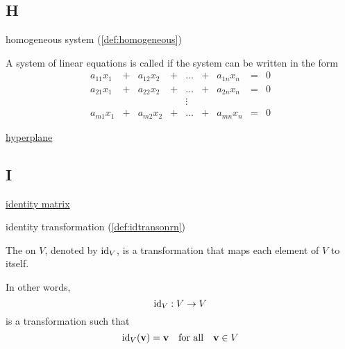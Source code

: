 \documentclass{ximera}
\begin{document}
\subsection{H}


homogeneous system (\ref{def:homogeneous})
\begin{expandable}
    A system of linear equations is called  if the system can be written in the form
$$\begin{array}{ccccccccc}
      a_{11}x_1 &+ &a_{12}x_2&+&\ldots&+&a_{1n}x_n&= &0 \\
	 a_{21}x_1 &+ &a_{22}x_2&+&\ldots&+&a_{2n}x_n&= &0 \\
     &&&&\vdots&&&& \\
     a_{m1}x_1 &+ &a_{m2}x_2&+&\ldots&+&a_{mn}x_n&= &0
    \end{array}$$
\end{expandable}

\href{https://ximera.osu.edu/oerlinalg/LinearAlgebra/RRN-0030/main}{hyperplane}

\subsection{I}

\href{https://ximera.osu.edu/oerlinalg/LinearAlgebra/MAT-0020/main}{identity matrix}

identity transformation (\ref{def:idtransonrn})
\begin{expandable}
    The  on $V$, denoted by $\text{id}_V$, is a transformation that maps each element of $V$ to itself.

In other words,
$$\text{id}_V:V\rightarrow V$$ is a transformation such that $$\text{id}_V(\mathbf{v})=\mathbf{v}\quad\text{for all}\quad \mathbf{v} \in V$$
\end{expandable}
\end{document}
